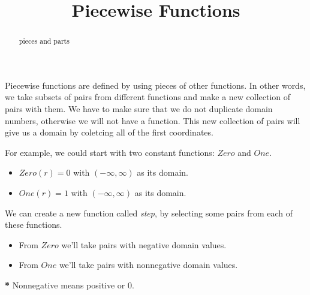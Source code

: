 \documentclass{ximera}
\title{Piecewise Functions}
\begin{document}
\begin{abstract}
pieces and parts
\end{abstract}
\maketitle



Piecewise functions are defined by using pieces of other functions. In other words, we take subsets of pairs from different functions and make a new collection of pairs with them.  We have to make sure that we do not duplicate domain numbers, otherwise we will not have a function.  This new collection of pairs will give us a domain by coletcing all of the first coordinates.

For example, we could start with two constant functions: $Zero$ and $One$.

\begin{itemize}
\item $Zero(r) = 0$ with $(-\infty, \infty)$ as its domain.
\item $One(r) = 1$ with $(-\infty, \infty)$ as its domain.
\end{itemize}

We can create a new function called \textit{step}, by selecting some pairs from each of these functions.  
\begin{itemize}
\item From $Zero$ we'll take pairs with negative domain values.
\item From $One$ we'll take pairs with nonnegative domain values.
\end{itemize}

\textbf{*} Nonnegative means positive or 0.
\end{document}
